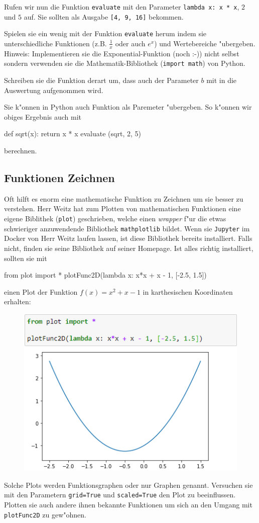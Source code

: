 \documentclass{article}
\begin{document}
Rufen wir nun die Funktion {\verb+evaluate+} mit den Parameter {\verb+lambda x: x * x+}, $2$ und $5$ auf. Sie sollten
als Ausgabe {\verb+[4, 9, 16]+} bekommen.

Spielen sie ein wenig mit der Funktion {\verb+evaluate+} herum indem sie unterschiedliche Funktionen (z.B. $\frac{1}{x}$ oder auch $e^x$) 
und Wertebereiche "ubergeben. 
\\Hinweis: Implementieren sie die Exponential-Funktion (noch :-)) nicht selbst sondern verwenden sie die Mathematik-Bibliothek (\verb+import math+) von Python.

Schreiben sie die Funktion derart um, dass auch der Parameter $b$ mit in die Auswertung aufgenommen wird.

Sie k"onnen in Python auch Funktion als Paremeter "ubergeben. So k"onnen wir obiges Ergebnis auch mit
\begin{python}
def sqrt(x):
    return x * x
evaluate (sqrt, 2, 5)
\end{python}
berechnen. 

\subsection*{Funktionen Zeichnen}
Oft hilft es enorm eine mathematische Funktion zu \glqq Zeichnen\grqq{} um sie besser zu \glqq verstehen\grqq{}. Herr Weitz hat zum Plotten von mathematischen Funktionen eine eigene Biblithek (\verb+plot+) geschrieben, welche einen \textit{wrapper} f"ur die etwas schwieriger anzuwendende Bibliothek \verb+mathplotlib+ bildet. Wenn sie \verb+Jupyter+ im Docker von Herr Weitz laufen lassen, ist diese Bibliothek bereits \glqq installiert\grqq{}. Falls nicht, finden sie seine Bibliothek auf seiner Homepage. Ist alles richtig installiert, sollten sie mit 
\begin{python}
from plot import *
plotFunc2D(lambda x: x*x + x - 1, [-2.5, 1.5])
\end{python}
einen Plot der Funktion $f(x) = x^2 + x -1$ in karthesischen Koordinaten erhalten:
\begin{figure}[H]
\centering
\includegraphics[width=0.5\columnwidth]{sqrtxplot.png}
\end{figure}\noindent
Solche Plots werden Funktionsgraphen oder nur Graphen genannt. Versuchen sie mit den Parametern \verb+grid=True+ und \verb+scaled=True+ den Plot zu beeinflussen. Plotten sie auch andere ihnen 
bekannte Funktionen um sich an den Umgang mit \verb+plotFunc2D+ zu gew"ohnen.
\end{document}
